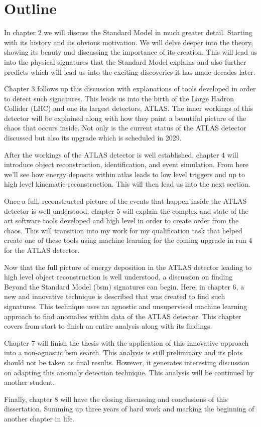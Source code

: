 \section{Outline}

In chapter 2 we will discuss the Standard Model in much greater detail. Starting with its history
and its obvious motivation. We will delve deeper into the theory, showing its beauty and discussing the 
importance of its creation. This will lead us into the physical signatures that the Standard Model explains
and also further predicts which will lead us into the exciting discoveries it has made decades later.
\par
Chapter 3 follows up this discussion with explanations of tools developed in order to detect such signatures.
This leads us into the birth of the Large Hadron Collider (LHC) and one its largest detectors, ATLAS.
The inner workings of this detector will be explained along with
how they paint a beautiful picture of the chaos that occurs inside. Not only is 
the current status of the ATLAS detector discussed but also its upgrade which is scheduled in 2029. 
\par
After the workings of the ATLAS detector is well established, chapter 4 will introduce object reconstruction,
identification, and event simulation. From here we'll see how energy deposits within \gls{atlas} leads to low level triggers and up to 
high level kinematic reconstruction. This will then lead us into the next section.
\par
Once a full, reconstructed picture of the events that happen inside the ATLAS detector is well understood, chapter 5 will
explain the complex and state of the art software tools developed and high level in order to create order from the chaos. 
This will transition into my work for my qualification task that helped create one of these tools using machine learning 
for the coming upgrade in run 4 for the ATLAS detector. 
\par
Now that the full picture of energy deposition in the ATLAS detector leading to high level object reconstruction is well understood,
a discussion on finding Beyond the Standard Model (\gls{bsm}) signatures can begin. Here, in chapter 6, a new and innovative 
technique is described that was created to find such signatures. This technique uses an agnostic and unsupervised machine
learning approach to find anomalies within data of the ATLAS detector. This chapter covers from start to finish an entire
analysis along with its findings.
\par
Chapter 7 will finish the thesis with the application of this innovative approach into a non-agnostic \gls{bsm} search.
This analysis is still preliminary and its plots should not be taken as final results. However, it generates interesting 
discussion on adapting this anomaly detection technique. This analysis will be continued by another student. 
\par
Finally, chapter 8 will have the closing discussing and conclusions of this dissertation. Summing up three years 
of hard work and marking the beginning of another chapter in life. 